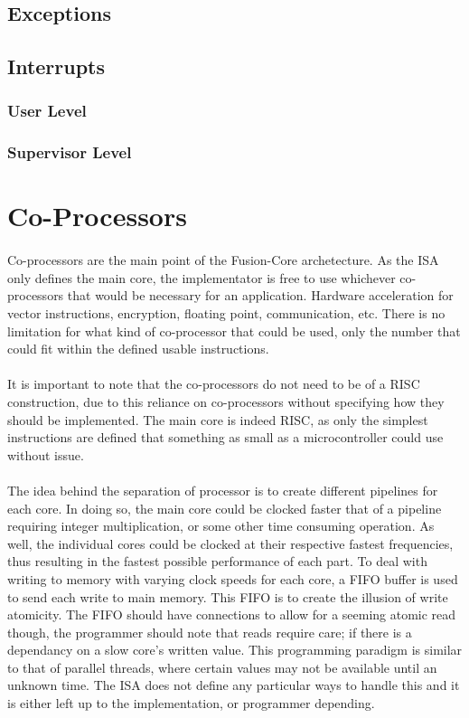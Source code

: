 \documentclass[letterpaper, 11pt]{article}
\begin{document}
\subsection{Exceptions}


\subsection{Interrupts}
\subsubsection{User Level}
\subsubsection{Supervisor Level}

\section{Co-Processors}
\paragraph{}Co-processors are the main point of the Fusion-Core archetecture. As the ISA only defines the main core, the implementator is free to use
whichever co-processors that would be necessary for an application. Hardware acceleration for vector instructions, encryption, floating point, communication,
etc. There is no limitation for what kind of co-processor that could be used, only the number that could fit within the defined usable instructions.
\paragraph{}It is important to note that the co-processors do not need to be of a RISC construction, due to this reliance on co-processors without
specifying how they should be implemented. The main core is indeed RISC, as only the simplest instructions are defined that something as small as a microcontroller
could use without issue.
\paragraph{}The idea behind the separation of processor is to create different pipelines for each core. In doing so, the main core could be clocked faster that of
a pipeline requiring integer multiplication, or some other time consuming operation. As well, the individual cores could be clocked at their respective 
fastest frequencies, thus resulting in the fastest possible performance of each part. To deal with writing to memory with varying clock speeds for each core,
a FIFO buffer is used to send each write to main memory. This FIFO is to create the illusion of write atomicity. The FIFO should have connections to allow
for a seeming atomic read though, the programmer should note that reads require care; if there is a dependancy on a slow core's written value. This programming 
paradigm is similar to that of parallel threads, where certain values may not be available until an unknown time. The ISA does not define any particular ways
to handle this and it is either left up to the implementation, or programmer depending.
\end{document}
